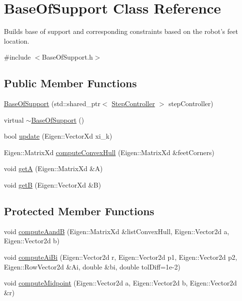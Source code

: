 \hypertarget{classBaseOfSupport}{\section{\-Base\-Of\-Support \-Class \-Reference}
\label{classBaseOfSupport}
}


\-Builds base of support and corresponding constraints based on the robot's feet location.  




{\ttfamily \#include $<$\-Base\-Of\-Support.\-h$>$}

\subsection*{\-Public \-Member \-Functions}
\begin{DoxyCompactItemize}
\item 
\hyperlink{classBaseOfSupport_a2490d7d641608be3b85c903de83313cc}{\-Base\-Of\-Support} (std\-::shared\-\_\-ptr$<$ \hyperlink{classStepController}{\-Step\-Controller} $>$ step\-Controller)
\item 
virtual \hyperlink{classBaseOfSupport_a8f2261d4d25cd677d0114df426dfbfa7}{$\sim$\-Base\-Of\-Support} ()
\item 
bool \hyperlink{classBaseOfSupport_af7907a87712c10c72f812f0304c013e4}{update} (\-Eigen\-::\-Vector\-Xd xi\-\_\-k)
\item 
\-Eigen\-::\-Matrix\-Xd \hyperlink{classBaseOfSupport_ae98c5398e4c53666e324c1fcfb1ef167}{compute\-Convex\-Hull} (\-Eigen\-::\-Matrix\-Xd \&feet\-Corners)
\item 
void \hyperlink{classBaseOfSupport_aea8a83e44da4acb1fdbf47cf0e3484d8}{get\-A} (\-Eigen\-::\-Matrix\-Xd \&\-A)
\item 
void \hyperlink{classBaseOfSupport_aadb8d9f374904f9f1a2fab2653437d27}{get\-B} (\-Eigen\-::\-Vector\-Xd \&\-B)
\end{DoxyCompactItemize}
\subsection*{\-Protected \-Member \-Functions}
\begin{DoxyCompactItemize}
\item 
void \hyperlink{classBaseOfSupport_ac0e7a364ac0ac945469a34d12ab3c9f4}{compute\-Aand\-B} (\-Eigen\-::\-Matrix\-Xd \&list\-Convex\-Hull, \-Eigen\-::\-Vector2d a, \-Eigen\-::\-Vector2d b)
\item 
void \hyperlink{classBaseOfSupport_a09b197a9869db126658d227532c1e03a}{compute\-Ai\-Bi} (\-Eigen\-::\-Vector2d r, \-Eigen\-::\-Vector2d p1, \-Eigen\-::\-Vector2d p2, \-Eigen\-::\-Row\-Vector2d \&\-Ai, double \&bi, double tol\-Diff=1e-\/2)
\item 
void \hyperlink{classBaseOfSupport_ad9a709f6df002662bfd67982a2c0e201}{compute\-Midpoint} (\-Eigen\-::\-Vector2d a, \-Eigen\-::\-Vector2d b, \-Eigen\-::\-Vector2d \&r)
\end{DoxyCompactItemize}

